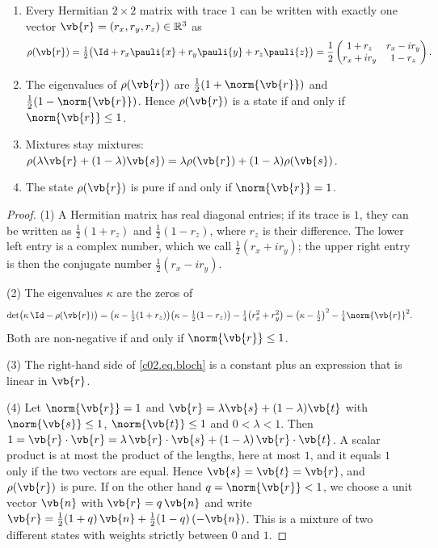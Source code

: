 \begin{proposition}\label{c02.prop.bloch}
  \begin{enumerate}
    \item Every Hermitian $2\times 2$ matrix with trace $1$ can be written with exactly
      one vector $\vb{r} = (r_x, r_y, r_z) \in \mathbb{R}^3$ as
      \begin{equation}\label{c02.eq.bloch}
        \rho(\vb{r}) = \tfrac12\bigl(\Id + r_x \pauli{x} + r_y \pauli{y} + r_z \pauli{z}\bigr)
        = \frac12 \begin{pmatrix} 1 + r_z & r_x - i r_y \\ r_x + i r_y & 1 - r_z \end{pmatrix} .
      \end{equation}
    \item The eigenvalues of $\rho(\vb{r})$ are $\tfrac12(1 + \norm{\vb{r}})$ and
      $\tfrac12(1 - \norm{\vb{r}})$. Hence $\rho(\vb{r})$ is a state if and only if
      $\norm{\vb{r}} \leq 1$.
    \item Mixtures stay mixtures:
      $\rho(\lambda \vb{r} + (1-\lambda)\vb{s}) = \lambda \rho(\vb{r}) + (1-\lambda)\rho(\vb{s})$.
    \item The state $\rho(\vb{r})$ is pure if and only if $\norm{\vb{r}} = 1$.
  \end{enumerate}
\end{proposition}
\begin{proof}
  (1) A Hermitian matrix has real diagonal entries; if its trace is $1$, they can be
  written as $\tfrac12(1 + r_z)$ and $\tfrac12(1 - r_z)$, where $r_z$ is their difference.
  The lower left entry is a complex number, which we call $\tfrac12(r_x + i r_y)$; the
  upper right entry is then the conjugate number $\tfrac12(r_x - i r_y)$.

  (2) The eigenvalues $\kappa$ are the zeros of
  \begin{equation*}
    \det\bigl(\kappa\, \Id - \rho(\vb{r})\bigr)
    = \bigl(\kappa - \tfrac12(1 + r_z)\bigr)\bigl(\kappa - \tfrac12(1 - r_z)\bigr) - \tfrac14\bigl(r_x^2 + r_y^2\bigr)
    = \bigl(\kappa - \tfrac12\bigr)^2 - \tfrac14 \norm{\vb{r}}^2 .
  \end{equation*}
  Both are non-negative if and only if $\norm{\vb{r}} \leq 1$.

  (3) The right-hand side of \eqref{c02.eq.bloch} is a constant plus an expression that is
  linear in $\vb{r}$.

  (4) Let $\norm{\vb{r}} = 1$ and $\vb{r} = \lambda \vb{s} + (1-\lambda)\vb{t}$ with
  $\norm{\vb{s}} \leq 1$, $\norm{\vb{t}} \leq 1$ and $0 < \lambda < 1$. Then
  $1 = \vb{r}\cdot\vb{r} = \lambda\, \vb{r}\cdot\vb{s} + (1-\lambda)\, \vb{r}\cdot\vb{t}$.
  A scalar product is at most the product of the lengths, here at most $1$, and it equals
  $1$ only if the two vectors are equal. Hence $\vb{s} = \vb{t} = \vb{r}$, and
  $\rho(\vb{r})$ is pure. If on the other hand $q = \norm{\vb{r}} < 1$, we choose a unit
  vector $\vb{n}$ with $\vb{r} = q\,\vb{n}$ and write
  $\vb{r} = \tfrac12(1+q)\,\vb{n} + \tfrac12(1-q)\,(-\vb{n})$. This is a mixture of two
  different states with weights strictly between $0$ and $1$.
\end{proof}

